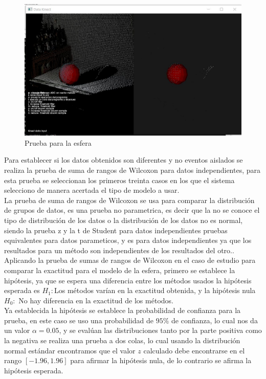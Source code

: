 	
	\begin{figure}[!htb] 
		\centering
		\includegraphics[width=1\textwidth]{03Resultados/imagenes/esfera.JPG}
		\caption{Prueba para la esfera} 
		\label{fig:pruebaEsf}
	\end{figure}
	
	
	Para establecer si los datos obtenidos son diferentes y no eventos aislados se realiza la prueba de suma de rangos de Wilcoxon para datos independientes, para esta prueba se seleccionan los primeros treinta casos en los que el sistema selecciono de manera acertada el tipo de modelo a usar. \\
	
	La prueba de suma de rangos de Wilcoxon se usa para comparar la distribución de grupos de datos, es una prueba no parametrica, es decir que la no se conoce el tipo de distribución de los datos o la distribución de los datos no es normal, siendo la prueba z y la t de Student para datos independientes pruebas equivalentes para datos parameticos, y es para datos independientes ya que los resultados para un método son independientes de los resultados del otro.\cite{bluman2009elementary}.\\
	
	Aplicando la prueba de sumas de rangos de Wilcoxon en el caso de estudio para comparar la exactitud para el modelo de la esfera, primero se establece la hipótesis, ya que se espera una diferencia entre los métodos usados la hipótesis esperada es $H_1:$Los métodos varían en la exactitud obtenida, y la hipótesis nula $H_0:$ No hay diferencia en la exactitud de los métodos.\\
	
	Ya establecida la hipótesis se establece la probabilidad de confianza para la prueba, en este caso se uso una probabilidad de $95\%$ de confianza, lo cual nos da un valor $\alpha=0.05$, y se evalúan las distribuciones tanto por la parte positiva como la negativa se realiza una prueba a dos colas, lo cual usando la distribución normal estándar encontramos que el valor $z$ calculado debe encontrarse en el rango $[-1.96,1.96]$ para afirmar la hipótesis nula, de lo contrario se afirma la hipótesis esperada.\\
	
